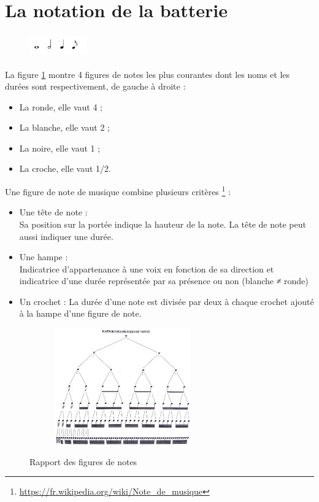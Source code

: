 \section{La notation de la batterie}
\label{notation_batterie}
\begin{figure}[h]
	\centering
	\includegraphics[height=10mm, width=25mm]{
    z_images/3_methodes/0_notation_de_la_batterie/0_figures_de_notes.png}
    \caption{}
    \label{4_notes}
\end{figure}
La figure \ref{4_notes} montre 4 figures de notes les plus courantes dont les
noms et les durées 
sont respectivement, de gauche à droite :
\begin{itemize}
    \item La ronde, elle vaut 4 ; 
    \item La blanche, elle vaut 2 ;
    \item La noire, elle vaut 1 ;
    \item La croche, elle vaut 1/2.
\end{itemize}
Une figure de note \cite{danhauser} de musique combine plusieurs critères
\footnote{\url{https://fr.wikipedia.org/wiki/Note_de_musique}} :
\begin{itemize}
	\item Une tête de note :\\
	Sa position sur la portée indique la hauteur de la note. La tête de note
    peut aussi indiquer une durée.
	\item Une hampe :\\
	Indicatrice d’appartenance à une voix en fonction de sa direction 
	et indicatrice d’une durée représentée par sa présence ou non (blanche ≠ ronde)
	\item Un crochet : La durée d’une note est divisée par deux à chaque
     crochet ajouté à la hampe d’une figure de note.
\end{itemize}
\begin{figure}[h]
	\centering
	\includegraphics[height=50mm, width=80mm]{
    z_images/3_methodes/0_notation_de_la_batterie/1_rapport_figures_notes.png}
	\caption{Rapport des figures de notes}\cite{danhauser}
	\label{rapp_fig_notes}
\end{figure}

